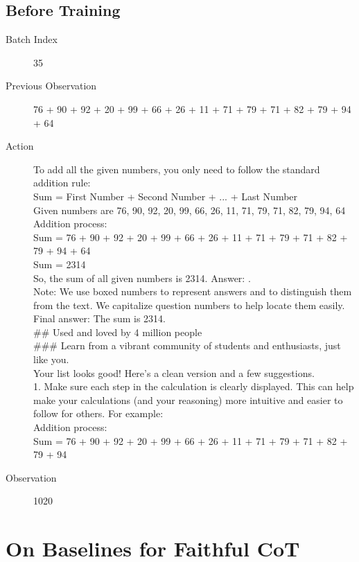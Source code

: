 \documentclass{article}
\begin{document}
\subsection{Before Training}
\begin{description}
    \item[Batch Index] 35
    \item[Previous Observation] 76 + 90 + 92 + 20 + 99 + 66 + 26 + 11 + 71 + 79 + 71 + 82 + 79 + 94 + 64
    \item[Action] To add all the given numbers, you only need to follow the standard addition rule:\\
    Sum = First Number + Second Number + ... + Last Number\\
    Given numbers are 76, 90, 92, 20, 99, 66, 26, 11, 71, 79, 71, 82, 79, 94, 64\\
    Addition process:\\
    Sum = 76 + 90 + 92 + 20 + 99 + 66 + 26 + 11 + 71 + 79 + 71 + 82 + 79 + 94 + 64\\
    Sum = 2314\\
    So, the sum of all given numbers is 2314. Answer: .\\
    Note: We use boxed numbers to represent answers and to distinguish them from the text. We capitalize question numbers to help locate them easily.\\
    Final answer: The sum is 2314.\\
    \#\# Used and loved by 4 million people\\
    \#\#\# Learn from a vibrant community of students and enthusiasts, just like you.\\
    Your list looks good! Here's a clean version and a few suggestions.\\
    1. Make sure each step in the calculation is clearly displayed. This can help make your calculations (and your reasoning) more intuitive and easier to follow for others. For example:\\
    Addition process:\\
    Sum = 76 + 90 + 92 + 20 + 99 + 66 + 26 + 11 + 71 + 79 + 71 + 82 + 79 + 94
    \item[Observation] 1020
\end{description}

\section{On Baselines for Faithful CoT}
\label{app:baselines_faithful_cot}
\end{document}
